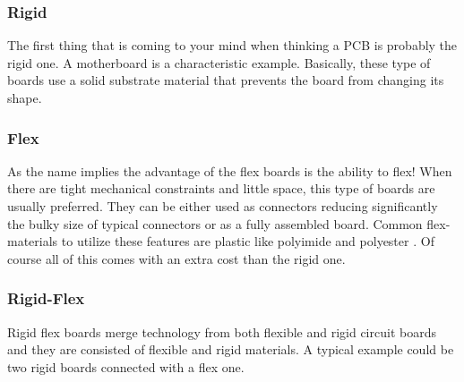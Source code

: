 \documentclass[final]{cubedoc}
\begin{document}
	\subsubsection{Rigid}
	The first thing that is coming to your mind when thinking a PCB is probably the rigid one. A motherboard is a characteristic example. Basically, these type of boards  use a solid substrate material that prevents the board from changing its shape. 
	
	\subsubsection{Flex}
	As the name implies the advantage of the flex boards is the ability to flex! When there are tight mechanical constraints and little space, this type of boards are usually preferred. They can be either used as connectors reducing significantly the bulky size of typical connectors or as a fully assembled board. Common flex-materials to utilize these features are plastic like polyimide and polyester \cite{altium:flex}. Of course all of this comes with an extra cost than the rigid one.
	
	\subsubsection{Rigid-Flex}
	Rigid flex boards merge technology from both flexible and rigid circuit boards and they are consisted of flexible and rigid materials. A typical example could be two rigid boards connected with a flex one.
	
	
\end{document}
